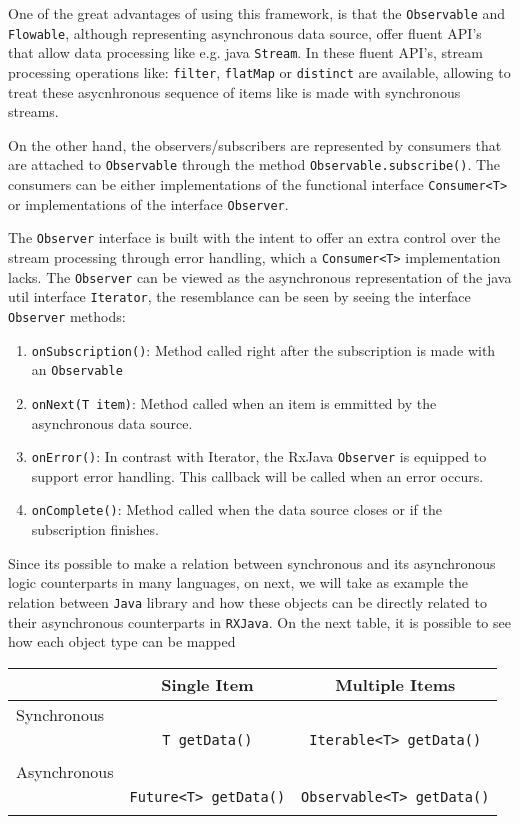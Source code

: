 One of the great advantages of using this framework, is that the \texttt{Observable} and \texttt{Flowable}, although representing asynchronous data source, offer fluent API's that allow data processing like e.g. java \texttt{Stream}.
In these fluent API's, stream processing operations like: \texttt{filter}, \texttt{flatMap} or \texttt{distinct} are available, allowing to treat these asycnhronous sequence of items like is made with synchronous streams.

On the other hand, the observers/subscribers are represented by consumers that are attached to \texttt{Observable} through the method \texttt{Observable.subscribe()}.
The consumers can be either implementations of the functional interface \texttt{Consumer<T>} or implementations of the interface \texttt{Observer}.

The \texttt{Observer} interface is built with the intent to offer an extra control over the stream processing through error handling, which a \texttt{Consumer<T>} implementation lacks. The \texttt{Observer} can be viewed as the asynchronous representation of the java util interface \texttt{Iterator}, the resemblance can be seen by seeing the interface \texttt{Observer} methods:

\begin{enumerate}
     \item \texttt{onSubscription()}: Method called right after the subscription is made with an \texttt{Observable} 
	 \item \texttt{onNext(T item)}: Method called when an item is emmitted by the asynchronous data source.
	 \item \texttt{onError()}: In contrast with Iterator, the RxJava \texttt{Observer} is equipped to support error handling. This callback will be called when an error occurs.
	 \item \texttt{onComplete()}: Method called when the data source closes or if the subscription finishes.
\end{enumerate}	

Since its possible to make a relation between synchronous and its asynchronous logic counterparts in many languages, on next, we will take as example the relation between \texttt{Java} library and how these objects can be directly related to their asynchronous counterparts in \texttt{RXJava}.
On the next table, it is possible to see how each object type can be mapped 

\begin{center}
\begin{tabular}{ |l|c|c| }
\hline
	& Single Item & Multiple Items \\ \hline
\multirow{}{}{Synchronous}
& & \\ 
& \texttt{T getData()}  & \texttt{Iterable<T> getData()} \\
	& & \\
	\hline
\multirow{}{}{Asynchronous}
& & \\ 
& \texttt{Future<T> getData()} & \texttt{Observable<T> getData()} \\
	& & \\
	\hline
\end{tabular}
\end{center}




